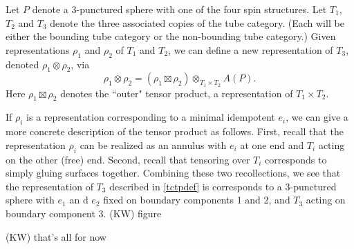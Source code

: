 \documentclass[12pt,a4paper]{article}
\newcommand{\tp}{\otimes}
\newcommand\be            {\begin{equation}}
\newcommand\ee            {\end{equation}}
\newcommand{\kw}[1]{{\color{kwcolor}\footnotesize{(KW) #1}}}
\begin{document}
Let $P$ denote a 3-punctured sphere with one of the four spin structures.
Let $T_1$, $T_2$ and $T_3$ denote the three associated copies of the tube category.
(Each will be either the bounding tube category or the non-bounding tube category.)
Given representations $\rho_1$ and $\rho_2$ of $T_1$ and $T_2$, we can define a new representation of $T_3$,
denoted $\rho_1\tp\rho_2$, via
\be  \label{tctpdef}
	\rho_1\tp\rho_2 = (\rho_1 \boxtimes \rho_2) \tp_{T_1\times T_2} A(P) .
\ee
Here $\rho_1 \boxtimes \rho_2$ denotes the ``outer" tensor product, a representation of $T_1\times T_2$.

If $\rho_i$ is a representation corresponding to a minimal idempotent $e_i$, we can give a more concrete
description of the tensor product as follows.
First, recall that the representation $\rho_i$ can be realized as an annulus with $e_i$ at one end
and $T_i$ acting on the other (free) end.
Second, recall that tensoring over $T_i$ corresponds to simply gluing surfaces together.
Combining these two recollections, we see that the representation of $T_3$ described in \eqref{tctpdef} is corresponds to
a 3-punctured sphere with $e_1$ an d $e_2$ fixed on boundary components 1 and 2, and $T_3$ acting on boundary component 3.
\kw{figure}

\kw{that's all for now}
 
 


 
\end{document}
